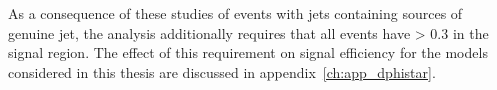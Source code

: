 
As a consequence of these studies of events with jets containing sources of
genuine \met jet, the analysis
additionally requires that all events have \mindphistar > 0.3 in the signal
region. The effect of this requirement on signal efficiency for the models 
considered in this thesis are discussed in appendix~\ref{ch:app_dphistar}.










